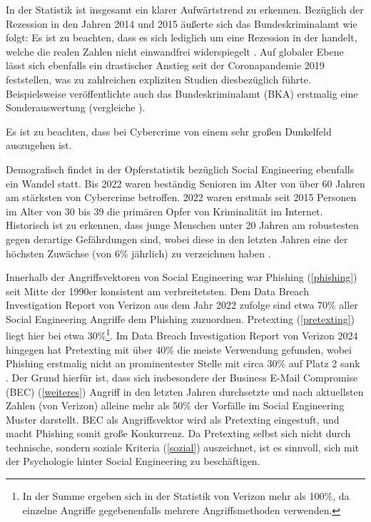 In der Statistik ist insgesamt ein klarer Aufwärtstrend zu erkennen. Bezüglich der Rezession in den Jahren 2014 und 2015 äußerte sich das Bundeskriminalamt wie folgt:
 Es ist zu beachten, dass es sich lediglich um eine Rezession in der  handelt, welche die realen Zahlen nicht einwandfrei widerspiegelt .
Auf globaler Ebene lässt sich ebenfalls ein drastischer Anstieg seit der Coronapandemie 2019 feststellen, was zu zahlreichen expliziten Studien diesbezüglich führte. Beispielsweise veröffentlichte auch das Bundeskriminalamt (BKA) erstmalig eine Sonderauswertung (vergleiche ).

Es ist zu beachten, dass bei Cybercrime von einem sehr großen Dunkelfeld auszugehen ist. 

Demografisch findet in der Opferstatistik bezüglich Social Engineering ebenfalls ein Wandel statt.
Bis 2022 waren beständig Senioren im Alter von über 60 Jahren am stärksten von Cybercrime betroffen.
2022 waren erstmals seit 2015 Personen im Alter von 30 bis 39 die primären Opfer von Kriminalität im Internet.
Historisch ist zu erkennen, dass junge Menschen unter 20 Jahren am robustesten gegen derartige Gefährdungen sind, wobei diese in den letzten Jahren eine der höchsten Zuwächse (von 6\% jährlich) zu verzeichnen haben . 

Innerhalb der Angriffsvektoren von Social Engineering war Phishing (\autoref{phishing}) seit Mitte der 1990er konsistent am verbreitetsten.
Dem Data Breach Investigation Report von Verizon aus dem Jahr 2022 zufolge sind etwa 70\% aller Social Engineering Angriffe dem Phishing zuzuordnen.
Pretexting (\autoref{pretexting}) liegt hier bei etwa 30\%\footnote{In der Summe ergeben sich in der Statistik von Verizon mehr als 100\%, da einzelne Angriffe gegebenenfalls mehrere Angriffsmethoden verwenden.}.
Im Data Breach Investigation Report von Verizon 2024 hingegen hat Pretexting mit über 40\% die meiste Verwendung gefunden, wobei Phishing erstmalig nicht an prominentester Stelle mit circa 30\% auf Platz 2 sank .
Der Grund hierfür ist, dass sich insbesondere der Business E-Mail Compromise (BEC) (\autoref{weiteres}) Angriff in den letzten Jahren durchsetzte und nach aktuellsten Zahlen (von Verizon) alleine mehr als 50\% der Vorfälle im Social Engineering Muster darstellt.
BEC als Angriffsvektor wird als Pretexting eingestuft, und macht Phishing somit große Konkurrenz. Da Pretexting selbst sich nicht durch technische, sondern soziale Kriteria (\autoref{sozial}) auszeichnet, ist es sinnvoll, sich mit der Psychologie hinter Social Engineering zu beschäftigen.

